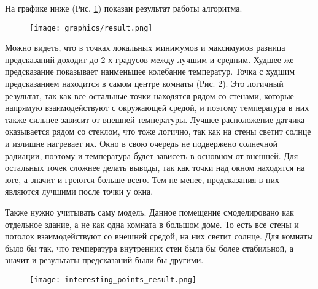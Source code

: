 На графике ниже (Рис. \ref{result}) показан результат работы алгоритма. 

\begin{figure}[H]
\centering
\texttt{[image: graphics/result.png]}
\caption{}
\label{result}
\end{figure}

Можно видеть, что в точках локальных минимумов и максимумов разница предсказаний доходит до $2$-х градусов между лучшим и средним. Худшее же предсказание показывает наименьшее колебание температур. Точка с худшим предсказанием находится в самом центре комнаты (Рис. \ref{interesting-points-result}). Это логичный результат, так как все остальные точки находятся рядом со стенами, которые напрямую взаимодействуют с окружающей средой, и поэтому температура в них также сильнее зависит от внешней температуры. Лучшее расположение датчика оказывается рядом со стеклом, что тоже логично, так как на стены светит солнце и излишне нагревает их. Окно в свою очередь не подвержено солнечной радиации, поэтому и температура будет зависеть в основном от внешней. Для остальных точек сложнее делать выводы, так как точки над окном находятся на юге, а значит и греются больше всего. Тем не менее, предсказания в них являются лучшими после точки у окна.

Также нужно учитывать саму модель. Данное помещение смоделировано как отдельное здание, а не как одна комната в большом доме. То есть все стены и потолок взаимодействуют со внешней средой, на них светит солнце. Для комнаты было бы так, что температура внутренних стен была бы более стабильной, а значит и результаты предсказаний были бы другими.


\begin{figure}[H]
\centering
\texttt{[image: interesting\_points\_result.png]}
\caption{}
\label{interesting-points-result}
\end{figure}








































